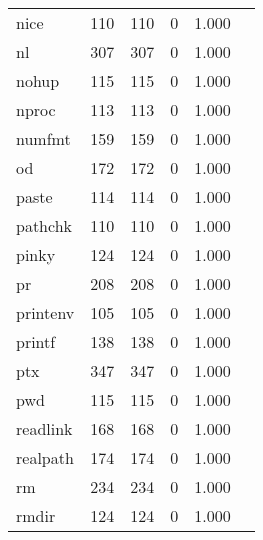 \begin{longtable}{lp{2.20cm}p{2.20cm}p{2.20cm}p{2.20cm}p{2.20cm}}
nice      &                     110 &              110 &                 0 &                        1.000 \\
nl        &                     307 &              307 &                 0 &                        1.000 \\
nohup     &                     115 &              115 &                 0 &                        1.000 \\
nproc     &                     113 &              113 &                 0 &                        1.000 \\
numfmt    &                     159 &              159 &                 0 &                        1.000 \\
od        &                     172 &              172 &                 0 &                        1.000 \\
paste     &                     114 &              114 &                 0 &                        1.000 \\
pathchk   &                     110 &              110 &                 0 &                        1.000 \\
pinky     &                     124 &              124 &                 0 &                        1.000 \\
pr        &                     208 &              208 &                 0 &                        1.000 \\
printenv  &                     105 &              105 &                 0 &                        1.000 \\
printf    &                     138 &              138 &                 0 &                        1.000 \\
ptx       &                     347 &              347 &                 0 &                        1.000 \\
pwd       &                     115 &              115 &                 0 &                        1.000 \\
readlink  &                     168 &              168 &                 0 &                        1.000 \\
realpath  &                     174 &              174 &                 0 &                        1.000 \\
rm        &                     234 &              234 &                 0 &                        1.000 \\
rmdir     &                     124 &              124 &                 0 &                        1.000 \\

\end{longtable}
